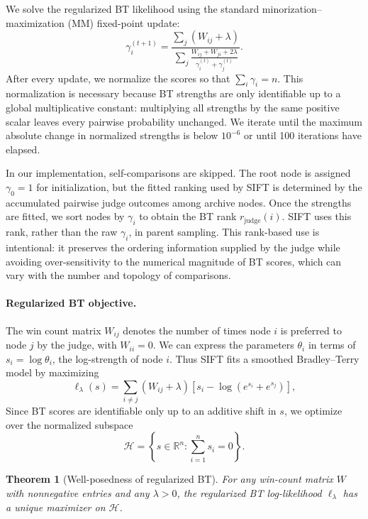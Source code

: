 \documentclass{article}
\newtheorem{theorem}{Theorem}
\begin{document}
We solve the regularized BT likelihood using the standard minorization--maximization (MM) fixed-point update:
\[
\gamma_i^{(t+1)}
=
\frac{
    \sum_j (W_{ij}+\lambda)
}{
    \sum_j
    \frac{
        W_{ij}+W_{ji}+2\lambda
    }{
        \gamma_i^{(t)}+\gamma_j^{(t)}
    }
}.
\]
After every update, we normalize the scores so that $\sum_i \gamma_i = n$. This normalization is necessary because BT strengths are only identifiable up to a global multiplicative constant: multiplying all strengths by the same positive scalar leaves every pairwise probability unchanged. We iterate until the maximum absolute change in normalized strengths is below $10^{-6}$ or until 100 iterations have elapsed.

In our implementation, self-comparisons are skipped. The root node is assigned $\gamma_0=1$ for initialization, but the fitted ranking used by SIFT is determined by the accumulated pairwise judge outcomes among archive nodes. Once the strengths are fitted, we sort nodes by $\gamma_i$ to obtain the BT rank $r_{\text{judge}}(i)$. SIFT uses this rank, rather than the raw $\gamma_i$, in parent sampling. This rank-based use is intentional: it preserves the ordering information supplied by the judge while avoiding over-sensitivity to the numerical magnitude of BT scores, which can vary with the number and topology of comparisons.

\paragraph{Regularized BT objective.}
The win count matrix $W_{ij}$ denotes the number of times node $i$ is preferred to node $j$ by the
judge, with $W_{ii}=0$. 
We can express the parameters $\theta_i$ in terms of $s_i=\log \theta_i$, the log-strength of node $i$.
Thus SIFT fits a smoothed Bradley--Terry model by maximizing
\[
    \ell_\lambda(s)
    =
    \sum_{i\neq j}
    (W_{ij}+\lambda)
    \left[
        s_i-\log\!\left(e^{s_i}+e^{s_j}\right)
    \right],
\]
Since BT scores are identifiable
only up to an additive shift in $s$, we optimize over the normalized subspace
\[
    \mathcal{H}
    =
    \left\{
        s\in\mathbb{R}^n:
        \sum_{i=1}^n s_i=0
    \right\}.
\]

\begin{theorem}[Well-posedness of regularized BT]
\label{thm:bt_well_posed}
For any win-count matrix $W$ with nonnegative entries and any $\lambda>0$,
the regularized BT log-likelihood $\ell_\lambda$ has a unique maximizer on
$\mathcal{H}$.
\end{theorem}
\end{document}
